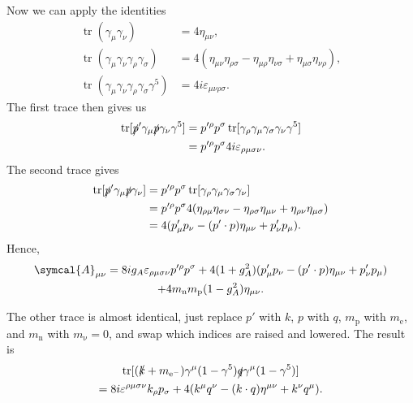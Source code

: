 \documentclass[fleqn]{NotesClass}
\newcommand{\Pparticle}[1]{\mathrm{#1}}
\newcommand{\Pe}{\ensuremath{\Pparticle{e}^{-}}}
\newcommand{\Pex}{\ensuremath{\Pparticle{e}}}
\newcommand{\Pnu}{\ensuremath{\upnu}}
\newcommand{\Pp}{\ensuremath{\Pparticle{p}}}
\newcommand{\Pn}{\ensuremath{\Pparticle{n}}}
\newcommand{\amplitude}{\symcal{A}}
\newcommand{\minkowskiMetric}{\eta}
\DeclareMathOperator{\tr}{tr}
\begin{document}
    Now we can apply the identities
    \begin{align}
        \tr(\gamma_\mu \gamma_\nu) &= 4\minkowskiMetric_{\mu\nu},\\
        \tr(\gamma_\mu\gamma_\nu\gamma_\rho\gamma_\sigma) &= 4(\minkowskiMetric_{\mu\nu}\minkowskiMetric_{\rho\sigma} - \minkowskiMetric_{\mu\rho}\minkowskiMetric_{\nu\sigma} + \minkowskiMetric_{\mu\sigma}\minkowskiMetric_{\nu\rho}),\\
        \tr(\gamma_\mu\gamma_\nu\gamma_\rho\gamma_\sigma\gamma^5) &= 4i\varepsilon_{\mu\nu\rho\sigma}.
    \end{align}
    The first trace then gives us
    \begin{align}
        \tr[\slashed{p}' \gamma_\mu \slashed{p} \gamma_\nu \gamma^5] &= p'^\rho p^\sigma \tr[\gamma_\rho \gamma_\mu \gamma_\sigma \gamma_\nu \gamma^5]\\
        &= p'^\rho p^\sigma 4i\varepsilon_{\rho\mu\sigma\nu}.
    \end{align}
    The second trace gives
    \begin{align}
        \tr[\slashed{p}'\gamma_\mu\slashed{p}\gamma_\nu] &= p'^\rho p^\sigma \tr[\gamma_\rho \gamma_\mu \gamma_\sigma \gamma_\nu]\\
        &= p'^\rho p^\sigma4(\minkowskiMetric_{\rho\mu}\minkowskiMetric_{\sigma\nu} - \minkowskiMetric_{\rho\sigma}\minkowskiMetric_{\mu\nu} + \minkowskiMetric_{\rho\nu}\minkowskiMetric_{\mu\sigma})\\
        &= 4(p'_\mu p_\nu - (p' \cdot p)\minkowskiMetric_{\mu\nu} + p'_\nu p_\mu).
    \end{align}
    Hence,
    \begin{multline}
        \amplitude_{\mu\nu} = 8ig_A \varepsilon_{\rho\mu\sigma\nu}p'^\rho p^\sigma + 4(1 + g_A^2)(p'_\mu p_\nu - (p' \cdot p)\minkowskiMetric_{\mu\nu} + p'_\nu p_\mu)\\
        + 4m_{\Pn}m_{\Pp}(1 - g_A^2)\minkowskiMetric_{\mu\nu}.
    \end{multline}
    
    The other trace is almost identical, just replace \(p'\) with \(k\), \(p\) with \(q\), \(m_{\Pp}\) with \(m_{\Pex}\), and \(m_{\Pn}\) with \(m_{\Pnu} = 0\), and swap which indices are raised and lowered.
    The result is
    \begin{multline}
        \tr[(\slashed{k} + m_{\Pe})\gamma^\mu(1 - \gamma^5)\slashed{q}\gamma^\mu(1 - \gamma^5)]\\
        = 8i\varepsilon^{\rho\mu\sigma\nu}k_\rho p_\sigma + 4(k^\mu q^\nu - (k \cdot q)\minkowskiMetric^{\mu\nu} + k^\nu q^\mu).
    \end{multline}
    
\end{document}
